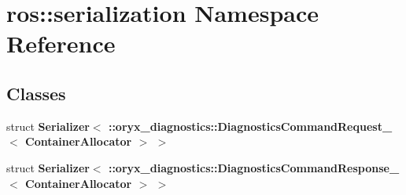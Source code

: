 \section{ros\-:\-:serialization \-Namespace \-Reference}
\label{namespaceros_1_1serialization}
\subsection*{\-Classes}
\begin{DoxyCompactItemize}
\item 
struct {\bf \-Serializer$<$ \-::oryx\-\_\-diagnostics\-::\-Diagnostics\-Command\-Request\-\_\-$<$ Container\-Allocator $>$ $>$}
\item 
struct {\bf \-Serializer$<$ \-::oryx\-\_\-diagnostics\-::\-Diagnostics\-Command\-Response\-\_\-$<$ Container\-Allocator $>$ $>$}
\end{DoxyCompactItemize}
